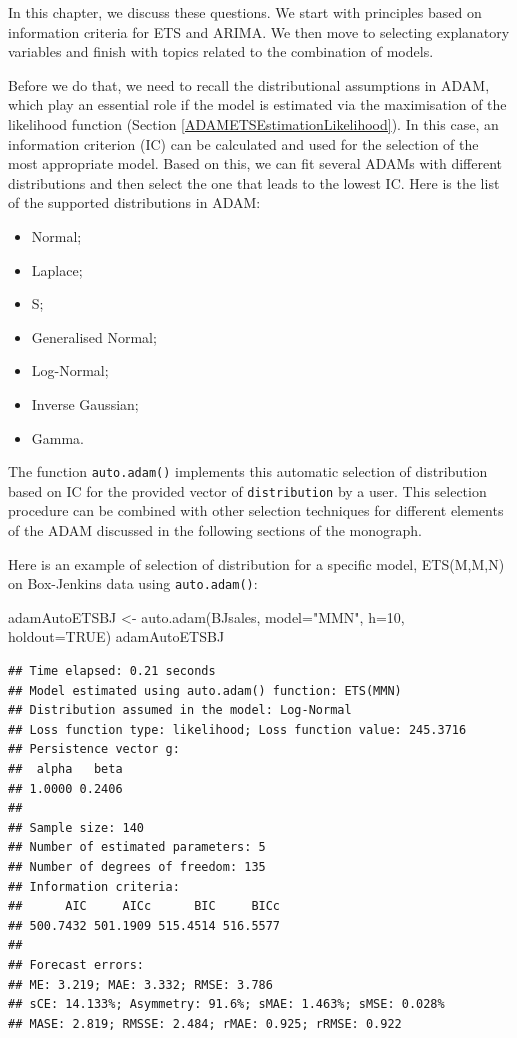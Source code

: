\documentclass[
]{book}
\newenvironment{Shaded}{\begin{snugshade}}{\end{snugshade}}
\newcommand{\AttributeTok}[1]{\textcolor[rgb]{0.77,0.63,0.00}{#1}}
\newcommand{\ConstantTok}[1]{\textcolor[rgb]{0.00,0.00,0.00}{#1}}
\newcommand{\DecValTok}[1]{\textcolor[rgb]{0.00,0.00,0.81}{#1}}
\newcommand{\FunctionTok}[1]{\textcolor[rgb]{0.00,0.00,0.00}{#1}}
\newcommand{\NormalTok}[1]{#1}
\newcommand{\OtherTok}[1]{\textcolor[rgb]{0.56,0.35,0.01}{#1}}
\newcommand{\StringTok}[1]{\textcolor[rgb]{0.31,0.60,0.02}{#1}}
\providecommand{\tightlist}{%
  \setlength{\itemsep}{0pt}\setlength{\parskip}{0pt}}
\theoremstyle{definition}
\theoremstyle{definition}
\theoremstyle{definition}
\theoremstyle{definition}
\theoremstyle{remark}
\begin{document}
In this chapter, we discuss these questions. We start with principles based on information criteria \citep[addressed in Chapter 13 of][]{SvetunkovSBA} for ETS and ARIMA. We then move to selecting explanatory variables and finish with topics related to the combination of models.

Before we do that, we need to recall the distributional assumptions in ADAM, which play an essential role if the model is estimated via the maximisation of the likelihood function (Section \ref{ADAMETSEstimationLikelihood}). In this case, an information criterion (IC) can be calculated and used for the selection of the most appropriate model. Based on this, we can fit several ADAMs with different distributions and then select the one that leads to the lowest IC. Here is the list of the supported distributions in ADAM:

\begin{itemize}
\tightlist
\item
  Normal;
\item
  Laplace;
\item
  S;
\item
  Generalised Normal;
\item
  Log-Normal;
\item
  Inverse Gaussian;
\item
  Gamma.
\end{itemize}

The function \texttt{auto.adam()} implements this automatic selection of distribution based on IC for the provided vector of \texttt{distribution} by a user. This selection procedure can be combined with other selection techniques for different elements of the ADAM discussed in the following sections of the monograph.

Here is an example of selection of distribution for a specific model, ETS(M,M,N) on Box-Jenkins data using \texttt{auto.adam()}:

\begin{Shaded}
\begin{Highlighting}[]
\NormalTok{adamAutoETSBJ }\OtherTok{\textless{}{-}} \FunctionTok{auto.adam}\NormalTok{(BJsales, }\AttributeTok{model=}\StringTok{"MMN"}\NormalTok{, }\AttributeTok{h=}\DecValTok{10}\NormalTok{, }\AttributeTok{holdout=}\ConstantTok{TRUE}\NormalTok{)}
\NormalTok{adamAutoETSBJ}
\end{Highlighting}
\end{Shaded}

\begin{verbatim}
## Time elapsed: 0.21 seconds
## Model estimated using auto.adam() function: ETS(MMN)
## Distribution assumed in the model: Log-Normal
## Loss function type: likelihood; Loss function value: 245.3716
## Persistence vector g:
##  alpha   beta 
## 1.0000 0.2406 
## 
## Sample size: 140
## Number of estimated parameters: 5
## Number of degrees of freedom: 135
## Information criteria:
##      AIC     AICc      BIC     BICc 
## 500.7432 501.1909 515.4514 516.5577 
## 
## Forecast errors:
## ME: 3.219; MAE: 3.332; RMSE: 3.786
## sCE: 14.133%; Asymmetry: 91.6%; sMAE: 1.463%; sMSE: 0.028%
## MASE: 2.819; RMSSE: 2.484; rMAE: 0.925; rRMSE: 0.922
\end{verbatim}
\end{document}
